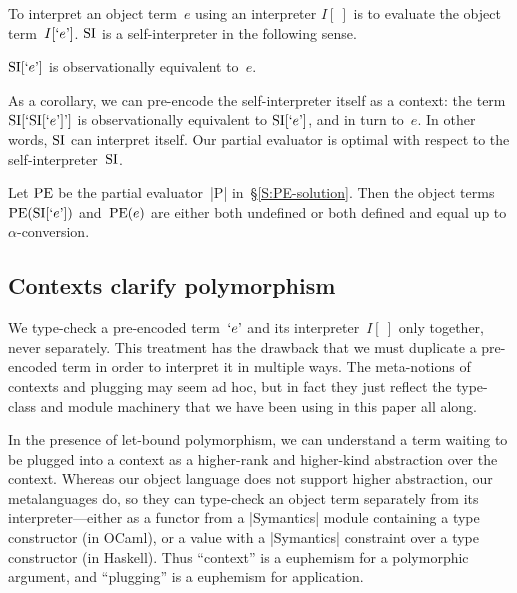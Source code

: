 To interpret an object term~$e$ using an interpreter $I[~]$ is to
evaluate the object term~$I[\encode{e}]$.  $\si$ is
a self\hyp interpreter in the following sense.
\begin{proposition}
    $\si[\encode{e}]$ is observationally equivalent to~$e$.
\end{proposition}
As a corollary, we can pre-encode the self\hyp interpreter itself as
a context: the term $\si[\encode{\si[\encode{e}]}]$ is observationally
equivalent to $\si[\encode{e}]$, and in turn to~$e$.  In other words,
$\si$ can interpret itself.  Our partial evaluator is optimal with respect to
the self\hyp interpreter~$\si$.
\begin{proposition}
    Let $\pe$ be the partial evaluator~|P| in~\S\ref{S:PE-solution}.
    Then the object terms $\pe(\si[\encode{e}])$ and~$\pe(e)$ are
    either both undefined or both defined and
    equal up to $\alpha$\hyp conversion.
\end{proposition}

\subsection{Contexts clarify polymorphism}
\label{S:clarify}

We type-check a pre-encoded term~$\encode{e}$ and its interpreter~$I[~]$
only together, never separately.  This treatment has the drawback that
we must duplicate a pre-encoded term in order to interpret it in
multiple ways.  The meta-notions of contexts and plugging may seem ad
hoc, but in fact they just reflect the type-class and module
machinery that we have been using in this paper all along.

In the presence of let-bound polymorphism, we can understand a term
waiting to be plugged into a context as a higher-rank and higher-kind
abstraction over the context.  Whereas our object language does not support
higher abstraction, our metalanguages do, so they can type-check an object term
separately from its interpreter---either as a functor from a |Symantics| module
containing a type constructor
(in OCaml), or a value with a |Symantics| constraint over a type
constructor (in Haskell).  Thus
``context'' is a euphemism for a polymorphic argument, and ``plugging''
is a euphemism for application.

